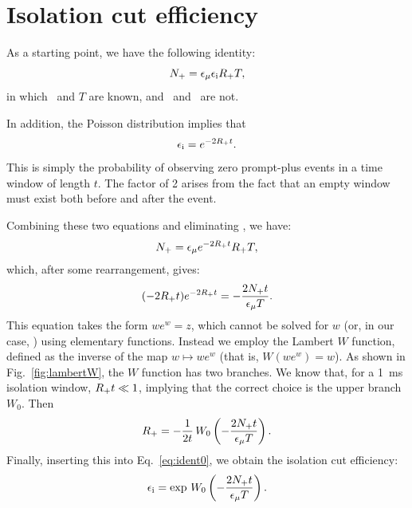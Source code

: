 \documentclass[../thesis.tex]{subfiles}
\begin{document}

\section{Isolation cut efficiency}
\label{sec:isolcuteff}

As a starting point, we have the following identity:
\begin{equation}
  \label{eq:ident0}
  N_\mathrm{+} = \epsilon_\mathrm{\mu} \epsilon_\mathrm{i} R_\mathrm{+} T,
\end{equation}
in which \emu\ and $T$ are known, and \eisol\ and \Rplu\ are not.

In addition, the Poisson distribution implies that
\begin{equation}
  \label{eq:ident1}
  \epsilon_\mathrm{i} = e^{-2R_\mathrm{+} t}.
\end{equation}
This is simply the probability of observing zero prompt-plus events in a time window of length $t$. The factor of 2 arises from the fact that an empty window must exist both before and after the event.

Combining these two equations and eliminating \eisol, we have:
\begin{equation}
  N_\mathrm{+} = \epsilon_\mathrm{\mu} e^{-2R_\mathrm{+} t} R_\mathrm{+} T,
\end{equation}
which, after some rearrangement, gives:
\begin{equation}
  (-2 R_\mathrm{+} t) e^{-2 R_\mathrm{+} t} = - \frac{2 N_\mathrm{+} t}{\epsilon_\mathrm{\mu} T}.
\end{equation}
This equation takes the form $we^w = z$, which cannot be solved for $w$ (or, in our case, \Rplu) using elementary functions. Instead we employ the Lambert $W$ function, defined as the inverse of the map $w \mapsto we^w$ (that is, $W(we^w) = w$). As shown in Fig.~\ref{fig:lambertW}, the $W$ function has two branches. We know that, for a 1~ms isolation window, $R_\mathrm{+} t \ll 1$, implying that the correct choice is the upper branch $W_0$. Then
\begin{equation}
  R_\mathrm{+} = -\frac{1}{2t}\, W_0 \left(-\frac{2N_\mathrm{+} t}{\epsilon_\mathrm{\mu} T}\right).
\end{equation}
Finally, inserting this into Eq.~\ref{eq:ident0}, we obtain the isolation cut efficiency:
\begin{equation}
  \epsilon_\mathrm{i} = \exp \, W_0 \left( -\frac{2N_\mathrm{+} t}{\epsilon_\mathrm{\mu} T} \right).
\end{equation}
\end{document}
